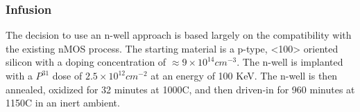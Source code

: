 \documentclass[10pt,a4paper,oneside]{article}
\begin{document}
\subsubsection{Infusion}
\begin{center}
\end{center}
The decision to use an n-well approach is based largely on the compatibility with the existing nMOS process.
The starting material is a p-type, <100> oriented silicon with a doping concentration of $\approx 9\times10^{14}cm^{-3}$.
The n-well is implanted with a $P^{31}$ dose of $2.5\times10^{12}cm^{-2}$ at an energy of 100 KeV.
The n-well is then annealed, oxidized for 32 minutes at 1000\degree C, and then driven-in for 960 minutes at 1150\degree C in an inert ambient.
\end{document}

